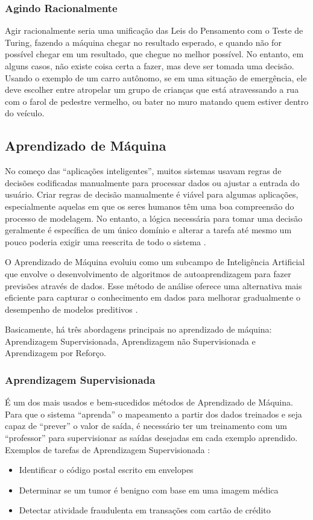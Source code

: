 \documentclass[
	12pt,				%
	openright,			%
	oneside,			%
	a4paper,			%
	english,			%
	spanish,			%
	brazil				%
	]{abntex2}
\begin{document}
	\subsubsection*{Agindo Racionalmente}
		Agir racionalmente seria uma unificação das Leis do Pensamento com o Teste de Turing, fazendo a máquina chegar no resultado esperado, e quando não for possível chegar em um resultado, que chegue no melhor possível. No entanto, em alguns casos, não existe coisa certa a fazer, mas deve ser tomada uma decisão. Usando o exemplo de um carro autônomo, se em uma situação de emergência, ele deve escolher entre atropelar um grupo de crianças que está atravessando a rua com o farol de pedestre vermelho, ou bater no muro matando quem estiver dentro do veículo.
	
	\subsection{Aprendizado de Máquina}
		No começo das ``aplicações inteligentes'', muitos sistemas usavam regras de decisões codificadas manualmente para processar dados ou ajustar a entrada do usuário. Criar regras de decisão manualmente é viável para algumas aplicações, especialmente aquelas em que os seres humanos têm uma boa compreensão do processo de modelagem. No entanto, a lógica necessária para tomar uma decisão geralmente é específica de um único domínio e alterar a tarefa até mesmo um pouco poderia exigir uma reescrita de todo o sistema \cite {guido_muller}.

		O Aprendizado de Máquina evoluiu como um subcampo de Inteligência Artificial que envolve o desenvolvimento de algoritmos de autoaprendizagem para fazer previsões através de dados. Esse método de análise oferece uma alternativa mais eficiente para capturar o conhecimento em dados para melhorar gradualmente o desempenho de modelos preditivos \cite{ r_julian_heart}.

		Basicamente, há três abordagens principais no aprendizado de máquina: Aprendizagem Supervisionada, Aprendizagem não Supervisionada e Aprendizagem por Reforço.

	\subsubsection*{Aprendizagem Supervisionada}
		É um dos mais usados e bem-sucedidos métodos de Aprendizado de Máquina. Para que o sistema ``aprenda'' o mapeamento a partir dos dados treinados e seja capaz de ``prever''  o valor de saída, é necessário ter um treinamento com um ``professor'' para supervisionar as saídas desejadas em cada exemplo aprendido. Exemplos de tarefas de Aprendizagem Supervisionada \cite {guido_muller}: 
	\begin{itemize}
	 	\item Identificar o código postal escrito em envelopes
		\item Determinar se um tumor é benigno com base em uma imagem médica
		\item Detectar atividade fraudulenta em transações com cartão de crédito
	\end{itemize}
	
\end{document}
